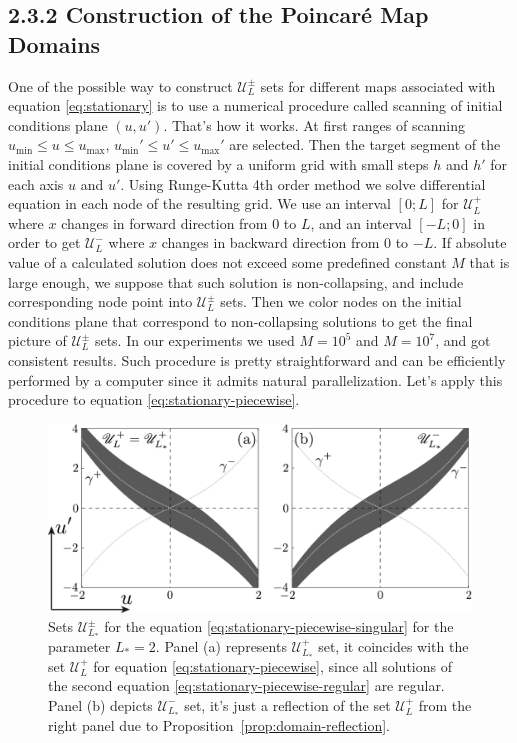 \subsection*{2.3.2 Construction of the Poincar\'e Map Domains}

One of the possible way to construct $\mathscr{U}_L^{\pm}$ sets for different maps associated with equation \eqref{eq:stationary} is to use a numerical procedure called scanning of initial conditions plane $(u, u')$.
That's how it works.
At first ranges of scanning $u_{\min} \le u \le u_{\max}$, $u_{\min}' \le u' \le u_{\max}'$ are selected.
Then the target segment of the initial conditions plane is covered by a uniform grid with small steps $h$ and $h'$ for each axis $u$ and $u'$.
Using Runge-Kutta 4th order method we solve differential equation in each node of the resulting grid.
We use an interval $[0; L]$ for $\mathscr{U}_L^+$ where $x$ changes in forward direction from $0$ to $L$, and an interval $[-L; 0]$ in order to get $\mathscr{U}_L^-$ where $x$ changes in backward direction from $0$ to $-L$.
If absolute value of a calculated solution does not exceed some predefined constant $M$ that is large enough, we suppose that such solution is non-collapsing, and include corresponding node point into $\mathscr{U}_L^{\pm}$ sets.
Then we color nodes on the initial conditions plane that correspond to non-collapsing solutions to get the final picture of $\mathscr{U}_L^{\pm}$ sets.
In our experiments we used $M = 10^5$ and $M = 10^7$, and got consistent results.
Such procedure is pretty straightforward and can be efficiently performed by a computer since it admits natural parallelization.
Let's apply this procedure to equation \eqref{eq:stationary-piecewise}.

\begin{figure}[h]
\centering
	\includegraphics[scale = 1]{pic/Poincare map domain for piecewise singular equation}
	\caption{
		Sets $\mathscr{U}_{L_*}^{\pm}$ for the equation \eqref{eq:stationary-piecewise-singular} for the parameter $L_* = 2$.
		Panel (a) represents $\mathscr{U}_{L_*}^+$ set, it coincides with the set $\mathscr{U}_L^+$ for equation \eqref{eq:stationary-piecewise}, since all solutions of the second equation \eqref{eq:stationary-piecewise-regular} are regular.
		Panel (b) depicts $\mathscr{U}_{L_*}^-$ set, it's just a reflection of the set $\mathscr{U}_L^+$ from the right panel due to Proposition~\ref{prop:domain-reflection}.
	}
\label{fig:poincare-map-domain-piecewise}
\end{figure}

